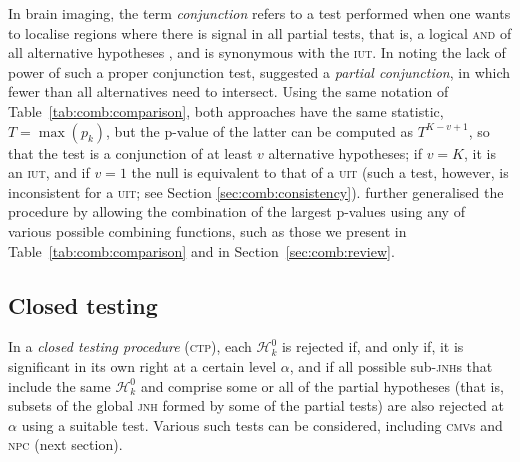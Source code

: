 In brain imaging, the term \emph{conjunction} refers to a test performed when one wants to localise regions where there is signal in all partial tests, that is, a logical \textsc{and} of all alternative hypotheses \citep{Nichols2005}, and is synonymous with the \textsc{iut}. In noting the lack of power of such a proper conjunction test, \citet{Friston2005} suggested a \emph{partial conjunction}, in which fewer than all alternatives need to intersect. Using the same notation of Table~\ref{tab:comb:comparison}, both approaches have the same statistic, $T = \max \left(p_{k}\right)$, but the p-value of the latter can be computed as $T^{K-v+1}$, so that the test is a conjunction of at least $v$ alternative hypotheses; if $v=K$, it is an \textsc{iut}, and if $v=1$ the null is equivalent to that of a \textsc{uit} (such a test, however, is inconsistent for a \textsc{uit}; see Section \ref{sec:comb:consistency}). \citet{Benjamini2008} further generalised the procedure by allowing the combination of the largest p-values using any of various possible combining functions, such as those we present in Table~\ref{tab:comb:comparison} and in Section~\ref{sec:comb:review}.

\subsection{Closed testing}
\label{sec:comb:ctp}

In a \emph{closed testing procedure} (\textsc{ctp}), each $\mathcal{H}^0_k$ is rejected if, and only if, it is significant in its own right at a certain level $\alpha$, and if all possible sub-\textsc{jnh}s that include the same $\mathcal{H}^0_k$ and comprise some or all of the partial hypotheses (that is, subsets of the global \textsc{jnh} formed by some of the partial tests) are also rejected at $\alpha$ using a suitable test. Various such tests can be considered, including \textsc{cmv}s and \textsc{npc} (next section).

